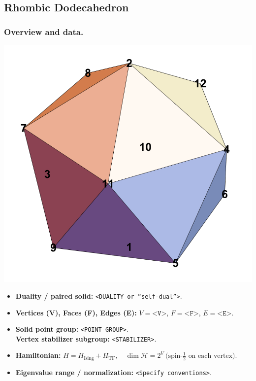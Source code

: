 \documentclass[11pt,a4paper]{article}
\newcommand{\Hising}{H_{\mathrm{Ising}}}
\newcommand{\Htf}{H_{\mathrm{TF}}}
\newcommand{\Htot}{H=\Hising+\Htf}
\begin{document}

\subsection*{Rhombic Dodecahedron}

\subsubsection*{Overview and data.}
\begin{center}
  \includegraphics[width=.6\linewidth]{icosahedron}
\end{center}

\begin{itemize}[leftmargin=1.5em]
  \item \textbf{Duality / paired solid:} \texttt{<DUALITY or “self-dual”>}.
  \item \textbf{Vertices (V), Faces (F), Edges (E):} $V=\texttt{<V>}$,\; $F=\texttt{<F>}$,\; $E=\texttt{<E>}$.
  \item \textbf{Solid point group:} \texttt{<POINT-GROUP>}.\\
        \textbf{Vertex stabilizer subgroup:} \texttt{<STABILIZER>}.
  \item \textbf{Hamiltonian:} \(
        \Htot,\quad
        \dim\mathcal{H} = 2^{V}\ \text{(spin-$\tfrac12$ on each vertex).}
        \)
  \item \textbf{Eigenvalue range / normalization:} \texttt{<Specify conventions>}.
\end{itemize}
\end{document}

